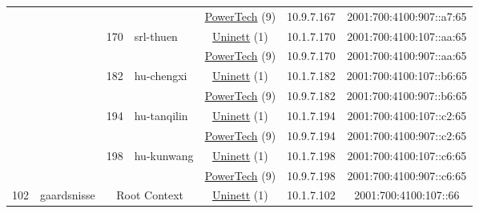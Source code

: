 \begin{small}
\begin{center}
\begin{longtable}{|c|c|c|c|c|c|c|c|}
  &  &  &  & \multicolumn{2}{|c|}{\tiny{\href{http://www.powertech.no}{PowerTech} (9)}} & \tiny{10.9.7.167} & \tiny{2001:700:4100:907::a7:65} \\* \cline{3-3}\cline{4-4}\cline{5-5}\cline{6-6}\cline{7-7}\cline{8-8}
  &  & \multirow{2}{*}{\tiny{170}} & \multicolumn{1}{|l|}{\multirow{2}{*}{\tiny{srl-thuen}}} & \multicolumn{2}{|c|}{\tiny{\href{https://www.uninett.no}{Uninett} (1)}} & \tiny{10.1.7.170} & \tiny{2001:700:4100:107::aa:65} \\* \cline{5-5}\cline{6-6}\cline{7-7}\cline{8-8}
  &  &  &  & \multicolumn{2}{|c|}{\tiny{\href{http://www.powertech.no}{PowerTech} (9)}} & \tiny{10.9.7.170} & \tiny{2001:700:4100:907::aa:65} \\* \cline{3-3}\cline{4-4}\cline{5-5}\cline{6-6}\cline{7-7}\cline{8-8}
  &  & \multirow{2}{*}{\tiny{182}} & \multicolumn{1}{|l|}{\multirow{2}{*}{\tiny{hu-chengxi}}} & \multicolumn{2}{|c|}{\tiny{\href{https://www.uninett.no}{Uninett} (1)}} & \tiny{10.1.7.182} & \tiny{2001:700:4100:107::b6:65} \\* \cline{5-5}\cline{6-6}\cline{7-7}\cline{8-8}
  &  &  &  & \multicolumn{2}{|c|}{\tiny{\href{http://www.powertech.no}{PowerTech} (9)}} & \tiny{10.9.7.182} & \tiny{2001:700:4100:907::b6:65} \\* \cline{3-3}\cline{4-4}\cline{5-5}\cline{6-6}\cline{7-7}\cline{8-8}
  &  & \multirow{2}{*}{\tiny{194}} & \multicolumn{1}{|l|}{\multirow{2}{*}{\tiny{hu-tanqilin}}} & \multicolumn{2}{|c|}{\tiny{\href{https://www.uninett.no}{Uninett} (1)}} & \tiny{10.1.7.194} & \tiny{2001:700:4100:107::c2:65} \\* \cline{5-5}\cline{6-6}\cline{7-7}\cline{8-8}
  &  &  &  & \multicolumn{2}{|c|}{\tiny{\href{http://www.powertech.no}{PowerTech} (9)}} & \tiny{10.9.7.194} & \tiny{2001:700:4100:907::c2:65} \\* \cline{3-3}\cline{4-4}\cline{5-5}\cline{6-6}\cline{7-7}\cline{8-8}
  &  & \multirow{2}{*}{\tiny{198}} & \multicolumn{1}{|l|}{\multirow{2}{*}{\tiny{hu-kunwang}}} & \multicolumn{2}{|c|}{\tiny{\href{https://www.uninett.no}{Uninett} (1)}} & \tiny{10.1.7.198} & \tiny{2001:700:4100:107::c6:65} \\* \cline{5-5}\cline{6-6}\cline{7-7}\cline{8-8}
  &  &  &  & \multicolumn{2}{|c|}{\tiny{\href{http://www.powertech.no}{PowerTech} (9)}} & \tiny{10.9.7.198} & \tiny{2001:700:4100:907::c6:65} \\ \hline
 \multirow{30}{*}{\tiny{102}} & \multicolumn{1}{|l|}{\multirow{30}{*}{\tiny{gaardsnisse}}} & \multicolumn{2}{|c|}{\multirow{2}{*}{\tiny{Root Context}}} & \multicolumn{2}{|c|}{\tiny{\href{https://www.uninett.no}{Uninett} (1)}} & \tiny{10.1.7.102} & \tiny{2001:700:4100:107::66} \\* \cline{5-5}\cline{6-6}\cline{7-7}\cline{8-8}

\end{longtable}
\end{center}
\end{small}
